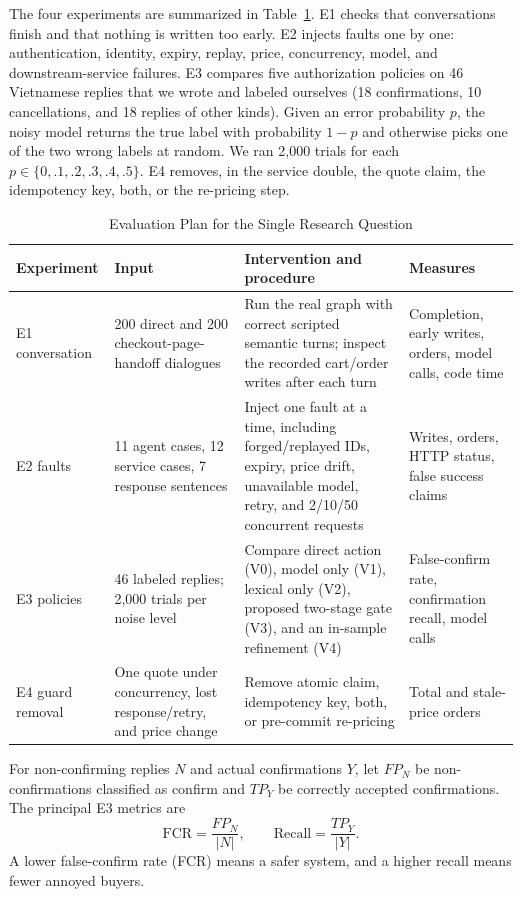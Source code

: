 \documentclass{IEEEtran}
\begin{document}
The four experiments are summarized in Table~\ref{tab:experiments}. E1 checks that conversations finish and that nothing is written too early. E2 injects faults one by one: authentication, identity, expiry, replay, price, concurrency, model, and downstream-service failures. E3 compares five authorization policies on 46 Vietnamese replies that we wrote and labeled ourselves (18 confirmations, 10 cancellations, and 18 replies of other kinds). Given an error probability $p$, the noisy model returns the true label with probability $1-p$ and otherwise picks one of the two wrong labels at random. We ran 2,000 trials for each $p\in\{0,.1,.2,.3,.4,.5\}$. E4 removes, in the service double, the quote claim, the idempotency key, both, or the re-pricing step.

\begin{table}[t]
\caption{Evaluation Plan for the Single Research Question}
\label{tab:experiments}
\centering
\footnotesize
\setlength{\tabcolsep}{4pt}
\begin{tabular}{@{}p{17mm}p{48mm}p{68mm}p{35mm}@{}}
\toprule
Experiment & Input & Intervention and procedure & Measures \\
\midrule
E1 conversation & 200 direct and 200 checkout-page-handoff dialogues & Run the real graph with correct scripted semantic turns; inspect the recorded cart/order writes after each turn & Completion, early writes, orders, model calls, code time \\
E2 faults & 11 agent cases, 12 service cases, 7 response sentences & Inject one fault at a time, including forged/replayed IDs, expiry, price drift, unavailable model, retry, and 2/10/50 concurrent requests & Writes, orders, HTTP status, false success claims \\
E3 policies & 46 labeled replies; 2,000 trials per noise level & Compare direct action (V0), model only (V1), lexical only (V2), proposed two-stage gate (V3), and an in-sample refinement (V4) & False-confirm rate, confirmation recall, model calls \\
E4 guard removal & One quote under concurrency, lost response/retry, and price change & Remove atomic claim, idempotency key, both, or pre-commit re-pricing & Total and stale-price orders \\
\bottomrule
\end{tabular}
\end{table}

For non-confirming replies $N$ and actual confirmations $Y$, let $FP_N$ be non-confirmations classified as confirm and $TP_Y$ be correctly accepted confirmations. The principal E3 metrics are
\begin{equation}
\mathrm{FCR}=\frac{FP_N}{|N|},\qquad
\mathrm{Recall}=\frac{TP_Y}{|Y|}.
\end{equation}
A lower false-confirm rate (FCR) means a safer system, and a higher recall means fewer annoyed buyers.
\end{document}
